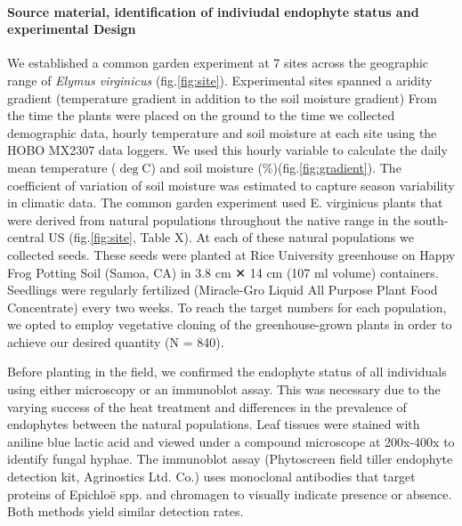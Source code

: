 \documentclass[11pt]{article}
\begin{document}
\paragraph {Source material, identification of indiviudal endophyte status and experimental Design} 
We established a common garden experiment at 7 sites across the geographic range of \emph {Elymus virginicus} (fig.\ref{fig:site}). 
Experimental sites spanned a aridity gradient (temperature gradient in addition to the soil moisture gradient)
From the time the plants were placed on the ground to the time we collected demographic data, hourly temperature and soil moisture at each site using the HOBO MX2307 data loggers. 
We used this hourly variable to calculate the daily mean temperature ($\deg$C) and soil moisture (\%)(fig.\ref{fig:gradient}). 
The coefficient of variation of soil moisture was estimated to capture season variability in climatic data. 
The common garden experiment used E. virginicus plants that were derived from natural populations throughout the native range in the south-central US (fig.\ref{fig:site}, Table X). 
At each of these natural populations we collected seeds. 
These seeds were planted at Rice University greenhouse on Happy Frog Potting Soil (Samoa, CA) in 3.8 cm ✕ 14 cm (107 ml volume) containers.
Seedlings were regularly fertilized (Miracle-Gro Liquid All Purpose Plant Food Concentrate) every two weeks. 
To reach the target numbers for each population, we opted to employ vegetative cloning of the greenhouse-grown plants in order to achieve our desired quantity (N = 840).

Before planting in the field, we confirmed the endophyte status of all individuals using either microscopy or an immunoblot assay. This was necessary due to the varying success of the heat treatment and differences in the prevalence of endophytes between the natural populations. Leaf tissues were stained with aniline blue lactic acid and viewed under a compound microscope at 200x-400x to identify fungal hyphae. The immunoblot assay (Phytoscreen field tiller endophyte detection kit, Agrinostics Ltd. Co.) uses monoclonal antibodies that target proteins of Epichloë spp. and chromagen to visually indicate presence or absence. Both methods yield similar detection rates.  
\end{document}
